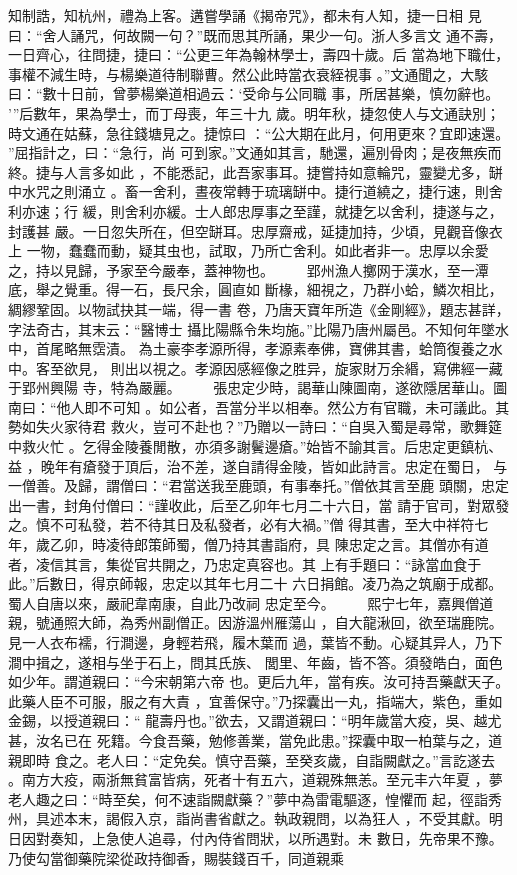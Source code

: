 \documentclass{ctexart}
\begin{document}
知制誥，知杭州，禮為上客。遘嘗學誦《揭帝咒》，都未有人知，捷一日相 見曰：``舍人誦咒，何故闕一句？''既而思其所誦，果少一句。浙人多言文 通不壽，一日齊心，往問捷，捷曰：``公更三年為翰林學士，壽四十歲。后 當為地下職仕，事權不減生時，与楊樂道待制聯曹。然公此時當衣衰絰視事 。''文通聞之，大駭曰：``數十日前，曾夢楊樂道相過云：`受命与公同職 事，所居甚樂，慎勿辭也。 '''后數年，果為學士，而丁母喪，年三十九 歲。明年秋，捷忽使人与文通訣別；時文通在姑蘇，急往錢塘見之。捷惊曰 ：``公大期在此月，何用更來？宜即速還。 ''屈指計之，曰：``急行，尚 可到家。''文通如其言，馳還，遍別骨肉；是夜無疾而終。捷与人言多如此 ，不能悉記，此吾家事耳。捷嘗持如意輪咒，靈變尤多，缾中水咒之則涌立 。畜一舍利，晝夜常轉于琉璃缾中。捷行道繞之，捷行速，則舍利亦速；行 緩，則舍利亦緩。士人郎忠厚事之至謹，就捷乞以舍利，捷遂与之，封護甚 嚴。一日忽失所在，但空缾耳。忠厚齋戒，延捷加持，少頃，見觀音像衣上 一物，蠢蠢而動，疑其虫也，試取，乃所亡舍利。如此者非一。忠厚以余愛 之，持以見歸，予家至今嚴奉，蓋神物也。 　　郢州漁人擲网于漢水，至一潭底，舉之覺重。得一石，長尺余，圓直如 斷椽，細視之，乃群小蛤，鱗次相比，綢繆鞏固。以物試抉其一端，得一書 卷，乃唐天寶年所造《金剛經》，題志甚詳，字法奇古，其末云：``醫博士 攝比陽縣令朱均施。''比陽乃唐州屬邑。不知何年墜水中，首尾略無霑漬。 為土豪李孝源所得，孝源素奉佛，寶佛其書，蛤筒復養之水中。客至欲見， 則出以視之。孝源因感經像之胜异，旋家財万余緡，寫佛經一藏于郢州興陽 寺，特為嚴麗。 　　張忠定少時，謁華山陳圖南，遂欲隱居華山。圖南曰：``他人即不可知 。如公者，吾當分半以相奉。然公方有官職，未可議此。其勢如失火家待君 救火，豈可不赴也？''乃贈以一詩曰：``自吳入蜀是尋常，歌舞筵中救火忙 。乞得金陵養閒散，亦須多謝鬢邊瘡。''始皆不諭其言。后忠定更鎮杭、益 ，晚年有瘡發于頂后，治不差，遂自請得金陵，皆如此詩言。忠定在蜀日， 与一僧善。及歸，謂僧曰：``君當送我至鹿頭，有事奉托。''僧依其言至鹿 頭關，忠定出一書，封角付僧曰：``謹收此，后至乙卯年七月二十六日，當 請于官司，對眾發之。慎不可私發，若不待其日及私發者，必有大禍。''僧 得其書，至大中祥符七年，歲乙卯，時凌待郎策師蜀，僧乃持其書詣府，具 陳忠定之言。其僧亦有道者，凌信其言，集從官共開之，乃忠定真容也。其 上有手題曰：``詠當血食于此。''后數日，得京師報，忠定以其年七月二十 六日捐館。凌乃為之筑廟于成都。蜀人自唐以來，嚴祀韋南康，自此乃改祠 忠定至今。 　　熙宁七年，嘉興僧道親，號通照大師，為秀州副僧正。因游溫州雁蕩山 ，自大龍湫回，欲至瑞鹿院。見一人衣布襦，行澗邊，身輕若飛，履木葉而 過，葉皆不動。心疑其异人，乃下澗中揖之，遂相与坐于石上，問其氏族、 閭里、年齒，皆不答。須發皓白，面色如少年。謂道親曰：``今宋朝第六帝 也。更后九年，當有疾。汝可持吾藥獻天子。此藥人臣不可服，服之有大責 ，宜善保守。''乃探囊出一丸，指端大，紫色，重如金錫，以授道親曰：`` 龍壽丹也。''欲去，又謂道親曰：``明年歲當大疫，吳、越尤甚，汝名已在 死籍。今食吾藥，勉修善業，當免此患。''探囊中取一柏葉与之，道親即時 食之。老人曰：``定免矣。慎守吾藥，至癸亥歲，自詣闕獻之。''言訖遂去 。南方大疫，兩浙無貧富皆病，死者十有五六，道親殊無恙。至元丰六年夏 ，夢老人趣之曰：``時至矣，何不速詣闕獻藥？''夢中為雷電驅逐，惶懼而 起，徑詣秀州，具述本末，謁假入京，詣尚書省獻之。執政親問，以為狂人 ，不受其獻。明日因對奏知，上急使人追尋，付內侍省問狀，以所遇對。未 數日，先帝果不豫。乃使勾當御藥院梁從政持御香，賜裝錢百千，同道親乘 
\end{document}
